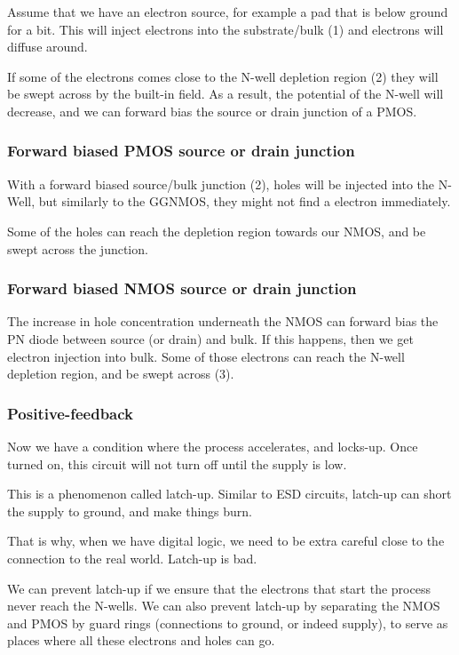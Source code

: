 Assume that we have an electron source, for example a pad that is below
ground for a bit. This will inject electrons into the substrate/bulk (1)
and electrons will diffuse around.

If some of the electrons comes close to the N-well depletion region (2)
they will be swept across by the built-in field. As a result, the
potential of the N-well will decrease, and we can forward bias the
source or drain junction of a PMOS.

\subsubsection{Forward biased PMOS source or drain
junction}\label{forward-biased-pmos-source-or-drain-junction}

With a forward biased source/bulk junction (2), holes will be injected
into the N-Well, but similarly to the GGNMOS, they might not find a
electron immediately.

Some of the holes can reach the depletion region towards our NMOS, and
be swept across the junction.

\subsubsection{Forward biased NMOS source or drain
junction}\label{forward-biased-nmos-source-or-drain-junction}

The increase in hole concentration underneath the NMOS can forward bias
the PN diode between source (or drain) and bulk. If this happens, then
we get electron injection into bulk. Some of those electrons can reach
the N-well depletion region, and be swept across (3).

\subsubsection{Positive-feedback}\label{positive-feedback}

Now we have a condition where the process accelerates, and locks-up.
Once turned on, this circuit will not turn off until the supply is low.

This is a phenomenon called latch-up. Similar to ESD circuits, latch-up
can short the supply to ground, and make things burn.

That is why, when we have digital logic, we need to be extra careful
close to the connection to the real world. Latch-up is bad.

We can prevent latch-up if we ensure that the electrons that start the
process never reach the N-wells. We can also prevent latch-up by
separating the NMOS and PMOS by guard rings (connections to ground, or
indeed supply), to serve as places where all these electrons and holes
can go.

